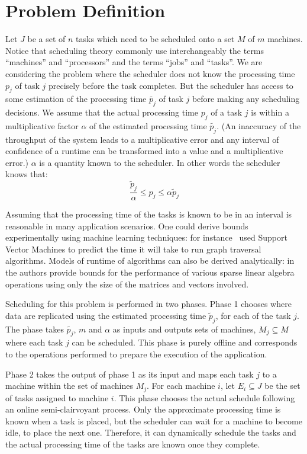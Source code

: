 \documentclass[10pt, conference, compsocconf]{IEEEtran}
\begin{document}
\section{Problem Definition}\label{sec2}
Let $J$ be a set of $n$ tasks which need to be scheduled onto a set $M$
of $m$ machines. Notice that scheduling theory commonly use interchangeably the terms ``machines'' and
``processors'' and the terms ``jobs'' and
``tasks''. We are considering the problem where the scheduler does not
know the processing time $p_j$ of task $j$ precisely before the task
completes.  But the scheduler has access to some estimation of the
processing time $\tilde{p_j}$ of task $j$ before making any scheduling
decisions. We assume that the actual processing time $p_j$ of a task
$j$ is within a multiplicative factor $\alpha$ of the estimated
processing time $\tilde{p_j}$. (An inaccuracy of the throughput of the system leads to a multiplicative error and any interval of confidence of a runtime can be transformed into a value and a multiplicative error.) $\alpha$ is a quantity known to the
scheduler. In other words the scheduler knows that:
 \begin{equation}\label{eq1}
\frac{\tilde{p}_{j}}{\alpha}\leq p_{j}\leq \alpha \tilde{p}_{j}
\end{equation}

Assuming that the processing time of the tasks is known to be in an
interval is reasonable in many application scenarios. One could derive
bounds experimentally using machine learning techniques: for
instance~\cite{You14-ICPP} used Support Vector Machines to predict the time it
will take to run graph traversal algorithms. Models of runtime of
algorithms can also be derived analytically:
in~\cite{Erlebacher14-ICS} the authors provide bounds for the
performance of various sparse linear algebra operations using only the
size of the matrices and vectors involved.


Scheduling for this problem is performed in two phases. Phase 1
chooses where data are replicated using the estimated processing time
$\tilde p_j $, for each of the task $j$. The phase takes
$\tilde{p_j}$, $m$ and $\alpha$ as inputs and outputs sets of machines,
$M_j \subseteq M $ where each task $j$ can be scheduled. This phase is
purely offline and corresponds to the operations performed to prepare
the execution of the application.

Phase 2 takes the output of phase 1 as its input and maps each task $j$
to a machine within the set of machines $M_j$. For each machine $i$,
let $E_i \subseteq J$ be the set of tasks assigned to machine
$i$. This phase chooses the actual schedule following an online
semi-clairvoyant process. Only the approximate processing time is
known when a task is placed, but the scheduler can wait for a machine
to become idle, to place the next one. Therefore, it can dynamically
schedule the tasks and the actual processing time of the tasks are
known once they complete.
\end{document}

